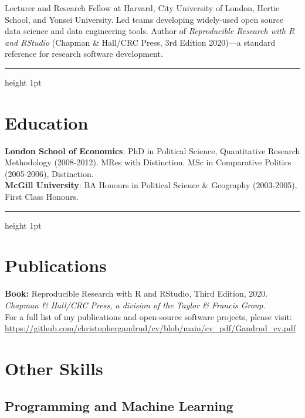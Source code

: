 \documentclass[a4paper]{article}
\begin{document}
Lecturer and Research Fellow at Harvard, City University of London, Hertie School, and Yonsei University. Led teams developing widely-used open source data science and data engineering tools. Author of \emph{Reproducible Research with R and RStudio} (Chapman \& Hall/CRC Press, 3rd Edition 2020)---a standard reference for research software development.

\vspace{0.25cm}
\medskip\hrule height 1pt
\vspace{0.5cm}

\section*{Education}

\noindent \textbf{London School of Economics}: PhD in Political Science, Quantitative Research Methodology (2008-2012). MRes with Distinction. MSc in Comparative Politics (2005-2006), Distinction. \\
\textbf{McGill University}: BA Honours in Political Science \& Geography (2003-2005), First Class Honours.

\vspace{0.25cm}
\medskip\hrule height 1pt
\vspace{0.5cm}


\section*{Publications}

\textbf{Book:} Reproducible Research with R and RStudio, Third Edition, 2020. {\emph{Chapman \& Hall/CRC Press, a division of the Taylor \& Francis Group}}. \\

\noindent For a full list of my publications and open-source software projects, please visit: \url{https://github.com/christophergandrud/cv/blob/main/cv_pdf/Gandrud_cv.pdf}

\section*{Other Skills}

\subsection*{Programming and Machine Learning}
\end{document}
